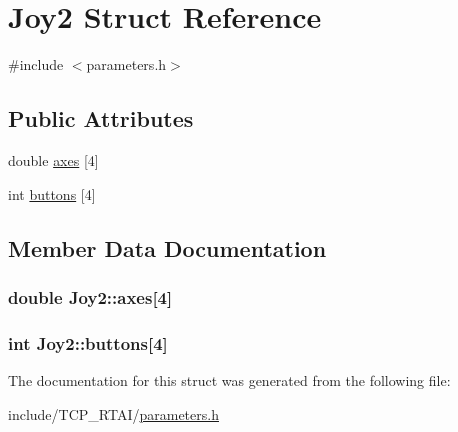 \hypertarget{structJoy2}{
\section{Joy2 Struct Reference}
\label{structJoy2}
}


{\ttfamily \#include $<$parameters.h$>$}

\subsection*{Public Attributes}
\begin{DoxyCompactItemize}
\item 
double \hyperlink{structJoy2_a4660760b96f81e5926d8fcaf07d6b4b7}{axes} \mbox{[}4\mbox{]}
\item 
int \hyperlink{structJoy2_ad2692cfd7380440769a252c890d84df3}{buttons} \mbox{[}4\mbox{]}
\end{DoxyCompactItemize}


\subsection{Member Data Documentation}
\hypertarget{structJoy2_a4660760b96f81e5926d8fcaf07d6b4b7}{
\subsubsection[{axes}]{\setlength{\rightskip}{0pt plus 5cm}double {\bf Joy2::axes}\mbox{[}4\mbox{]}}}
\label{structJoy2_a4660760b96f81e5926d8fcaf07d6b4b7}
\hypertarget{structJoy2_ad2692cfd7380440769a252c890d84df3}{
\subsubsection[{buttons}]{\setlength{\rightskip}{0pt plus 5cm}int {\bf Joy2::buttons}\mbox{[}4\mbox{]}}}
\label{structJoy2_ad2692cfd7380440769a252c890d84df3}


The documentation for this struct was generated from the following file:\begin{DoxyCompactItemize}
\item 
include/TCP\_\-RTAI/\hyperlink{include_2TCP__RTAI_2parameters_8h}{parameters.h}\end{DoxyCompactItemize}
